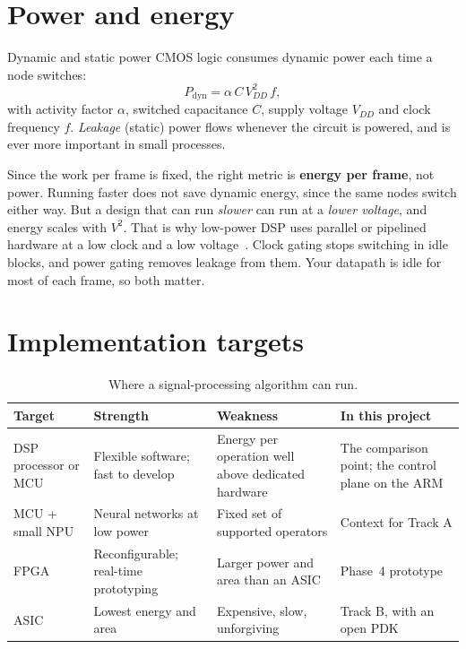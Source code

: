 \section{Power and energy}\label{sec:primer:power}

\begin{conceptbox}{Dynamic and static power}
CMOS logic consumes dynamic power each time a node switches:
\begin{equation}
  P_\text{dyn} = \alpha\,C\,V_{DD}^2\,f,
\end{equation}
with activity factor $\alpha$, switched capacitance $C$, supply voltage
$V_{DD}$ and clock frequency $f$. \emph{Leakage} (static) power flows whenever
the circuit is powered, and is ever more important in small processes.
\end{conceptbox}

Since the work per frame is fixed, the right metric is \textbf{energy per
frame}, not power. Running faster does not save dynamic energy, since the same
nodes switch either way. But a design that can run \emph{slower} can run at a
\emph{lower voltage}, and energy scales with $V^2$. That is why low-power DSP
uses parallel or pipelined hardware at a low clock and a low
voltage~\cite{chandrakasan1992lowpower}. Clock gating stops switching in idle
blocks, and power gating removes leakage from them. Your datapath is idle for
most of each frame, so both matter.

\section{Implementation targets}\label{sec:primer:targets}

\begin{table}[htbp]
\centering\footnotesize
\caption{Where a signal-processing algorithm can run.}
\label{tab:primer:targets}
\begin{tabularx}{\textwidth}{@{}lLLL@{}}
\toprule
Target & Strength & Weakness & In this project \\
\midrule
DSP processor or MCU & Flexible software; fast to develop & Energy per operation well above dedicated hardware & The comparison point; the control plane on the ARM \\
MCU + small NPU & Neural networks at low power & Fixed set of supported operators & Context for Track A \\
FPGA & Reconfigurable; real-time prototyping & Larger power and area than an ASIC & Phase~4 prototype \\
ASIC & Lowest energy and area & Expensive, slow, unforgiving & Track B, with an open PDK \\
\bottomrule
\end{tabularx}
\end{table}

